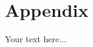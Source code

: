 		\large
			\begingroup
				\let\clearpage\relax
				\chapter*{Appendix}
			\endgroup


		\normalsize
			Your text here...
		\break
		\pagebreak